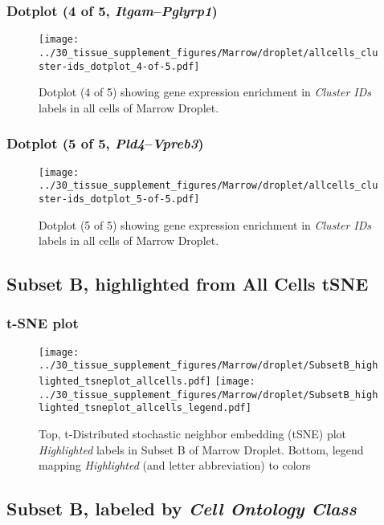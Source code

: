 \clearpage

\subsubsection{Dotplot (4 of 5, \emph{Itgam}--\emph{Pglyrp1})}
\begin{figure}[h]
\centering
\texttt{[image: ../30\_tissue\_supplement\_figures/Marrow/droplet/allcells\_cluster-ids\_dotplot\_4-of-5.pdf]}

\caption{ Dotplot (4 of 5)  showing gene expression enrichment in \emph{Cluster IDs} labels in all cells of Marrow Droplet. }
\end{figure}


\clearpage

\subsubsection{Dotplot (5 of 5, \emph{Pld4}--\emph{Vpreb3})}
\begin{figure}[h]
\centering
\texttt{[image: ../30\_tissue\_supplement\_figures/Marrow/droplet/allcells\_cluster-ids\_dotplot\_5-of-5.pdf]}

\caption{ Dotplot (5 of 5)  showing gene expression enrichment in \emph{Cluster IDs} labels in all cells of Marrow Droplet. }
\end{figure}


\clearpage
\subsection{Subset B, highlighted from All Cells tSNE}
\subsubsection{t-SNE plot}
\begin{figure}[h]
\centering
\texttt{[image: ../30\_tissue\_supplement\_figures/Marrow/droplet/SubsetB\_highlighted\_tsneplot\_allcells.pdf]}
\texttt{[image: ../30\_tissue\_supplement\_figures/Marrow/droplet/SubsetB\_highlighted\_tsneplot\_allcells\_legend.pdf]}
\caption{Top, t-Distributed stochastic neighbor embedding (tSNE) plot  \emph{Highlighted} labels in Subset B of Marrow Droplet. Bottom, legend mapping \emph{Highlighted} (and letter abbreviation) to colors}
\end{figure}


\clearpage

\subsection{Subset B, labeled by \emph{Cell Ontology Class}}

